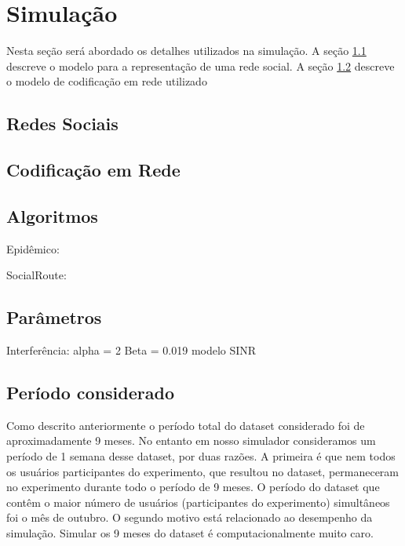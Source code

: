 \section{Simulação}\label{modelagem}

Nesta seção será abordado os detalhes utilizados na simulação. A seção
\ref{sec:redesSociais} descreve o modelo para a representação de uma
rede social. A seção \ref{sec:codeRede} descreve o modelo de codificação
em rede utilizado
 
\subsection{Redes Sociais} \label{sec:redesSociais}


\subsection{Codificação em Rede}\label{sec:codeRede}


\subsection{Algoritmos}\label{algoritmos}

Epidêmico:

SocialRoute:

\subsection{Parâmetros}

Interferência: alpha = 2 Beta = 0.019 modelo SINR


\subsection{Período considerado}

Como descrito anteriormente o período total do dataset considerado foi
de aproximadamente 9 meses. No entanto em nosso simulador consideramos
um período de 1 semana desse dataset, por duas razões. A primeira é que
nem todos os usuários participantes do experimento, que resultou no
dataset, permaneceram no experimento durante todo o período de 9 meses.
O período do dataset que contêm o maior número de usuários
(participantes do experimento) simultâneos foi o mês de outubro. O
segundo motivo está relacionado ao desempenho da simulação. Simular os 9
meses do dataset é computacionalmente muito caro.

